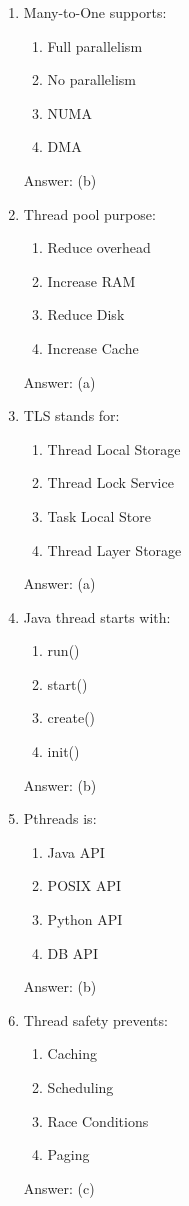 \begin{enumerate}
\item Many-to-One supports:
\begin{enumerate}[label=(\alph*)]
\item Full parallelism
\item No parallelism
\item NUMA
\item DMA
\end{enumerate}
Answer: (b)

\item Thread pool purpose:
\begin{enumerate}[label=(\alph*)]
\item Reduce overhead
\item Increase RAM
\item Reduce Disk
\item Increase Cache
\end{enumerate}
Answer: (a)

\item TLS stands for:
\begin{enumerate}[label=(\alph*)]
\item Thread Local Storage
\item Thread Lock Service
\item Task Local Store
\item Thread Layer Storage
\end{enumerate}
Answer: (a)

\item Java thread starts with:
\begin{enumerate}[label=(\alph*)]
\item run()
\item start()
\item create()
\item init()
\end{enumerate}
Answer: (b)

\item Pthreads is:
\begin{enumerate}[label=(\alph*)]
\item Java API
\item POSIX API
\item Python API
\item DB API
\end{enumerate}
Answer: (b)

\item Thread safety prevents:
\begin{enumerate}[label=(\alph*)]
\item Caching
\item Scheduling
\item Race Conditions
\item Paging
\end{enumerate}
Answer: (c)


\end{enumerate}
